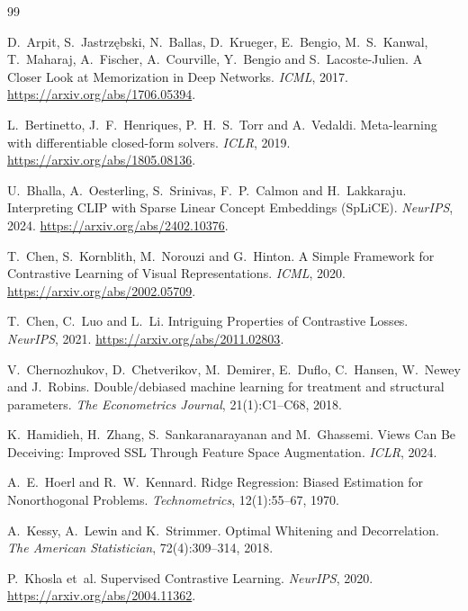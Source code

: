 \documentclass{article}
\begin{document}
\begingroup
\footnotesize
\setlength{\bibsep}{3pt plus 1pt}
\begin{thebibliography}{99}

D.~Arpit, S.~Jastrz\k{e}bski, N.~Ballas, D.~Krueger, E.~Bengio, M.~S.~Kanwal, T.~Maharaj, A.~Fischer,
A.~Courville, Y.~Bengio and S.~Lacoste-Julien.
A Closer Look at Memorization in Deep Networks. \emph{ICML}, 2017.
\url{https://arxiv.org/abs/1706.05394}.

L.~Bertinetto, J.~F.~Henriques, P.~H.~S.~Torr and A.~Vedaldi.
Meta-learning with differentiable closed-form solvers. \emph{ICLR}, 2019.
\url{https://arxiv.org/abs/1805.08136}.

U.~Bhalla, A.~Oesterling, S.~Srinivas, F.~P.~Calmon and H.~Lakkaraju.
Interpreting CLIP with Sparse Linear Concept Embeddings (SpLiCE). \emph{NeurIPS}, 2024.
\url{https://arxiv.org/abs/2402.10376}.

T.~Chen, S.~Kornblith, M.~Norouzi and G.~Hinton.
A Simple Framework for Contrastive Learning of Visual Representations. \emph{ICML}, 2020.
\url{https://arxiv.org/abs/2002.05709}.

T.~Chen, C.~Luo and L.~Li.
Intriguing Properties of Contrastive Losses. \emph{NeurIPS}, 2021.
\url{https://arxiv.org/abs/2011.02803}.

V.~Chernozhukov, D.~Chetverikov, M.~Demirer, E.~Duflo, C.~Hansen, W.~Newey and J.~Robins.
Double/debiased machine learning for treatment and structural parameters.
\emph{The Econometrics Journal}, 21(1):C1--C68, 2018.

K.~Hamidieh, H.~Zhang, S.~Sankaranarayanan and M.~Ghassemi.
Views Can Be Deceiving: Improved SSL Through Feature Space Augmentation. \emph{ICLR}, 2024.

A.~E.~Hoerl and R.~W.~Kennard.
Ridge Regression: Biased Estimation for Nonorthogonal Problems. \emph{Technometrics}, 12(1):55--67, 1970.

A.~Kessy, A.~Lewin and K.~Strimmer.
Optimal Whitening and Decorrelation. \emph{The American Statistician}, 72(4):309--314, 2018.

P.~Khosla et~al.
Supervised Contrastive Learning. \emph{NeurIPS}, 2020.
\url{https://arxiv.org/abs/2004.11362}.


\end{thebibliography}
\end{document}
